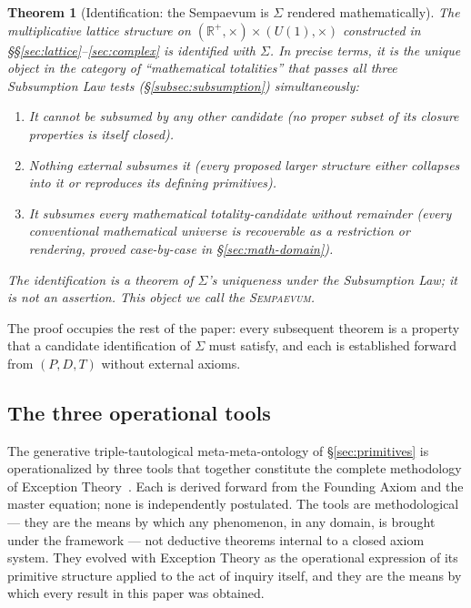\documentclass[11pt,a4paper]{article}
\newtheorem{theorem}{Theorem}[section]
\theoremstyle{definition}
\theoremstyle{remark}
\newcommand{\R}{\mathbb{R}}
\newcommand{\Sempaevum}{\textnormal{\textsc{Sempaevum}}}
\begin{document}
\begin{theorem}[Identification: the Sempaevum is $\Sigma$ rendered mathematically]\label{thm:identification-Sigma}
The multiplicative lattice structure on $(\R^{+},\times)\times (U(1),\times)$ constructed in \S\S\ref{sec:lattice}--\ref{sec:complex} is identified with $\Sigma$. In precise terms, it is the unique object in the category of ``mathematical totalities'' that passes all three Subsumption Law tests (\S\ref{subsec:subsumption}) simultaneously:
\begin{enumerate}[label=(\roman*),leftmargin=*]
\item It cannot be subsumed by any other candidate (no proper subset of its closure properties is itself closed).
\item Nothing external subsumes it (every proposed larger structure either collapses into it or reproduces its defining primitives).
\item It subsumes every mathematical totality-candidate without remainder (every conventional mathematical universe is recoverable as a restriction or rendering, proved case-by-case in \S\ref{sec:math-domain}).
\end{enumerate}
The identification is a theorem of $\Sigma$'s uniqueness under the Subsumption Law; it is \emph{not} an assertion. This object we call the \Sempaevum.
\end{theorem}

The proof occupies the rest of the paper: every subsequent theorem is a property that a candidate identification of $\Sigma$ must satisfy, and each is established forward from $(P,D,T)$ without external axioms.


\subsection{The three operational tools}\label{subsec:three-tools}

The generative triple-tautological meta-meta-ontology of \S\ref{sec:primitives} is operationalized by three tools that together constitute the complete methodology of Exception Theory~\cite{ThreeTools}. Each is derived forward from the Founding Axiom and the master equation; none is independently postulated. The tools are methodological --- they are the means by which any phenomenon, in any domain, is brought under the framework --- not deductive theorems internal to a closed axiom system. They evolved with Exception Theory as the operational expression of its primitive structure applied to the act of inquiry itself, and they are the means by which every result in this paper was obtained.
\end{document}
